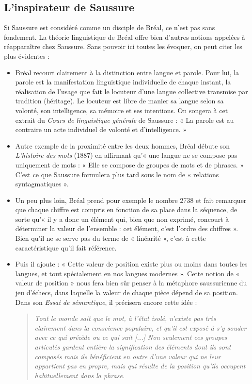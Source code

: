 \subsection{L’inspirateur de Saussure}
Si Saussure est considéré comme un disciple de Bréal, ce n’est pas sans fondement. La théorie linguistique de Bréal offre bien d’autres notions appelées à réapparaître chez Saussure. Sans pouvoir ici toutes les évoquer, on peut citer les plus évidentes :
\begin{itemize}
\item Bréal recourt clairement à la distinction entre langue et parole. Pour lui, la parole est la manifestation linguistique individuelle de chaque instant, la réalisation de l’usage que fait le locuteur d’une langue collective transmise par tradition (héritage). Le locuteur est libre de manier sa langue selon sa volonté, son intelligence, sa mémoire et ses intentions. On songera à cet extrait du \textit{Cours de linguistique générale} de Saussure : « La parole est au contraire un acte individuel de volonté et d’intelligence. »
\item Autre exemple de la proximité entre les deux hommes, Bréal débute son \textit{L’histoire des mots} (1887) en affirmant qu’« une langue ne se compose pas uniquement de mots : « Elle se compose de groupes de mots et de phrases. » C’est ce que Saussure formulera plus tard sous le nom de « relations syntagmatiques ».
\item Un peu plus loin, Bréal prend pour exemple le nombre 2738 et fait remarquer que chaque chiffre est compris en fonction de sa place dans la séquence, de sorte qu’« il y a donc un élément qui, bien que non exprimé, concourt à déterminer la valeur de l’ensemble : cet élément, c’est l’ordre des chiffres ». Bien qu’il ne se serve pas du terme de « linéarité », c’est à cette caractéristique qu’il fait référence.
\item Puis il ajoute : « Cette valeur de position existe plus ou moins dans toutes les langues, et tout spécialement en nos langues modernes ». Cette notion de « valeur de position » nous fera bien sûr penser à la métaphore saussurienne du jeu d’échecs, dans laquelle la valeur de chaque pièce dépend de sa position. Dans son \textit{Essai de sémantique}, il précisera encore cette idée :
\begin{quote}\small\itshape
Tout le monde sait que le mot, à l’état isolé, n’existe pas très clairement dans la conscience populaire, et qu’il est exposé à s’y souder avec ce qui précède ou ce qui suit [...] Non seulement ces groupes articulés gardent entière la signification des éléments dont ils sont composés mais ils bénéficient en outre d’une valeur qui ne leur appartient pas en propre, mais qui résulte de la position qu’ils occupent habituellement dans la phrase.

\end{quote}
\end{itemize}
